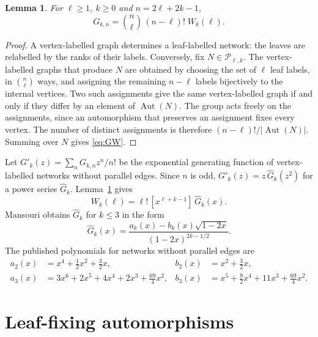 \documentclass[11pt,a4paper]{article}
\newtheorem{lemma}[theorem]{Lemma}
\theoremstyle{definition}
\newcommand{\Aut}{\operatorname{Aut}}
\newcommand{\cP}{\mathcal{P}}
\begin{document}
\begin{lemma}\label{lem:vertexlabelled}
For $\ell\ge1$, $k\ge0$ and $n=2\ell+2k-1$,
\begin{equation}\label{eq:GW}
G_{k,n}=\binom{n}{\ell}\,(n-\ell)!\;W_k(\ell).
\end{equation}
\end{lemma}

\begin{proof}
A vertex-labelled graph determines a leaf-labelled network: the leaves are relabelled by the ranks of their labels. Conversely, fix $N\in\cP_{\ell,k}$. The vertex-labelled graphs that produce $N$ are obtained by choosing the set of $\ell$ leaf labels, in $\binom{n}{\ell}$ ways, and assigning the remaining $n-\ell$ labels bijectively to the internal vertices. Two such assignments give the same vertex-labelled graph if and only if they differ by an element of $\Aut(N)$. The group acts freely on the assignments, since an automorphism that preserves an assignment fixes every vertex. The number of distinct assignments is therefore $(n-\ell)!/|\Aut(N)|$. Summing over $N$ gives \eqref{eq:GW}.
\end{proof}

Let $G'_k(z)=\sum_n G_{k,n}z^n/n!$ be the exponential generating function of vertex-labelled networks without parallel edges. Since $n$ is odd, $G'_k(z)=z\,\widehat G_k(z^2)$ for a power series $\widehat G_k$. Lemma~\ref{lem:vertexlabelled} gives
\begin{equation}\label{eq:WfromG}
W_k(\ell)=\ell!\,[x^{\ell+k-1}]\,\widehat G_k(x).
\end{equation}
Mansouri \cite{Mansouri22} obtains $\widehat G_k$ for $k\le3$ in the form
\begin{equation}\label{eq:Mform}
\widehat G_k(x)=\frac{a_k(x)-b_k(x)\sqrt{1-2x}}{(1-2x)^{2k-1/2}}.
\end{equation}
The published polynomials for networks without parallel edges are
\begin{align}
a_2(x)&=x^4+\tfrac12x^2+\tfrac32x, & b_2(x)&=x^2+\tfrac32x, \label{eq:M2}\\
a_3(x)&=3x^6+2x^5+4x^4+2x^3+\tfrac{69}{4}x^2, & b_3(x)&=x^5+\tfrac92x^4+11x^3+\tfrac{69}{4}x^2. \label{eq:M3}
\end{align}



\section{Leaf-fixing automorphisms}\label{sec:aut}
\end{document}
